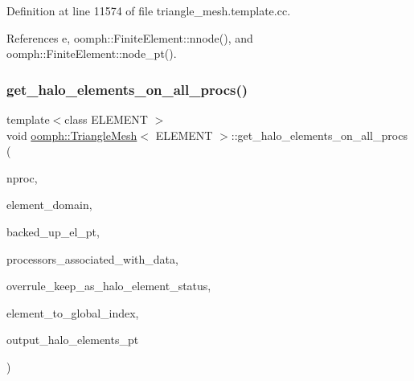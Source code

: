 Definition at line 11574 of file triangle\+\_\+mesh.\+template.\+cc.



References e, oomph\+::\+Finite\+Element\+::nnode(), and oomph\+::\+Finite\+Element\+::node\+\_\+pt().

\mbox{\label{classoomph_1_1TriangleMesh_a30672c4e1beac8a4db1c7e01a1d610a9}} 
\subsubsection{\texorpdfstring{get\+\_\+halo\+\_\+elements\+\_\+on\+\_\+all\+\_\+procs()}{get\_halo\_elements\_on\_all\_procs()}}
{\footnotesize\ttfamily template$<$class E\+L\+E\+M\+E\+NT $>$ \\
void \hyperlink{classoomph_1_1TriangleMesh}{oomph\+::\+Triangle\+Mesh}$<$ E\+L\+E\+M\+E\+NT $>$\+::get\+\_\+halo\+\_\+elements\+\_\+on\+\_\+all\+\_\+procs (\begin{DoxyParamCaption}\item[{const unsigned \&}]{nproc,  }\item[{const \hyperlink{classoomph_1_1Vector}{Vector}$<$ unsigned $>$ \&}]{element\+\_\+domain,  }\item[{const \hyperlink{classoomph_1_1Vector}{Vector}$<$ \hyperlink{classoomph_1_1GeneralisedElement}{Generalised\+Element} $\ast$$>$ \&}]{backed\+\_\+up\+\_\+el\+\_\+pt,  }\item[{std\+::map$<$ \hyperlink{classoomph_1_1Data}{Data} $\ast$, std\+::set$<$ unsigned $>$ $>$ \&}]{processors\+\_\+associated\+\_\+with\+\_\+data,  }\item[{const bool \&}]{overrule\+\_\+keep\+\_\+as\+\_\+halo\+\_\+element\+\_\+status,  }\item[{std\+::map$<$ \hyperlink{classoomph_1_1GeneralisedElement}{Generalised\+Element} $\ast$, unsigned $>$ \&}]{element\+\_\+to\+\_\+global\+\_\+index,  }\item[{\hyperlink{classoomph_1_1Vector}{Vector}$<$ \hyperlink{classoomph_1_1Vector}{Vector}$<$ \hyperlink{classoomph_1_1Vector}{Vector}$<$ \hyperlink{classoomph_1_1GeneralisedElement}{Generalised\+Element} $\ast$$>$ $>$ $>$ \&}]{output\+\_\+halo\+\_\+elements\+\_\+pt }\end{DoxyParamCaption})\hspace{0.3cm}{\ttfamily [protected]}}




